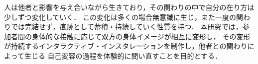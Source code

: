 人は他者と影響を与え合いながら生きており，その関わりの中で自分の在り方は少しずつ変化していく．
この変化は多くの場合無意識に生じ，また一度の関わりでは完結せず，痕跡として蓄積・持続していく性質を持つ．
本研究では，参加者間の身体的な接触に応じて双方の身体イメージが相互に変形し，
その変形が持続するインタラクティブ・インスタレーションを制作し，他者との関わりによって生じる
自己変容の過程を体験的に問い直すことを目的とする．
